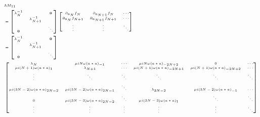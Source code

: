 \documentclass[11pt,a4paper,titlepage]{jsreport}
\theoremstyle{definition}
\begin{document}
\begin{equation}
  \tiny
  \begin{split}
    &\Lambda M_{11}\\
    &=\begin{bmatrix}
      \lambda^{-1}_N & & \mathbf{0} \\
      & \lambda^{-1}_{N+1} &\\
      \mathbf{0} &  & \ddots
    \end{bmatrix}
    \begin{bmatrix}
      \partial_{a_{N}} f_{N} & \partial_{a_{N+1}} f_{N}  & \cdots \\
      \partial_{a_{N}} f_{N+1} & \partial_{a_{N+1}} f_{N+1}  & \cdots \\
      \vdots & \vdots & \ddots \\
    \end{bmatrix}\\
    &=\begin{bmatrix}
      \lambda^{-1}_N &  & \mathbf{0} \\
      & \lambda^{-1}_{N+1} &\\
      \mathbf{0} &  & \ddots
    \end{bmatrix}\\
    &\begin{bmatrix}
      \lambda_{N} & \mu i N \omega (a*a)_{-1} & \cdots & \mu i N \omega (a*a)_{-2N+2} & 0 & \cdots \\
      \mu i (N+1) \omega (a*a)_{1} & \lambda_{N+1} & \cdots & \mu i (N+1) \omega (a*a)_{-2N+1} & \mu i (N+1) \omega (a*a)_{-2N+2} & \cdots \\
      \vdots & \ddots & \ddots & \ddots & \ddots & \ddots \\
      \mu i (3N-2) \omega (a*a)_{2N-2} & \mu i (3N-2) \omega (a*a)_{2N-1} & \ddots & \lambda_{3N-2} & \mu i (3N-2) \omega (a*a)_{-1} & \cdots \\
      0 & \mu i (3N-3) \omega (a*a)_{2N-2} & \ddots & \mu i (3N-3) \omega (a*a)_{1} & \ddots & \ddots \\
      \vdots & \vdots & \vdots & \vdots & \vdots & \ddots \\
    \end{bmatrix}
  \end{split}
\end{equation}
\end{document}

